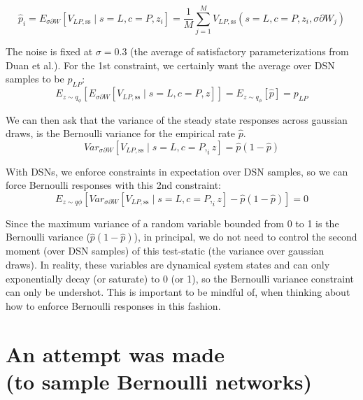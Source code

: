 \documentclass[11pt]{article}
\begin{document}
\begin{equation}
 \hat{p}_i = E_{\sigma \partial W} \left[ V_{LP,\text{ss}} \mid s=L, c=P, z_i \right] = \frac{1}{M}\sum_{j=1}^M V_{LP,\text{ss}}(s=L, c=P, z_i, \sigma \partial W_j)
 \end{equation}

The noise is fixed at $\sigma = 0.3$ (the average of satisfactory parameterizations from Duan et al.).  For the 1st constraint, we certainly want the average over DSN samples to be $p_{LP}$:
\begin{equation}
E_{z \sim q_\phi} \left[ E_{\sigma \partial W} \left[ V_{LP,\text{ss}} \mid s=L, c=P, z \right] \right] = E_{z \sim q_\phi} \left[ \hat{p} \right] = p_{LP}
\end{equation}

We can then ask that the variance of the steady state responses across gaussian draws, is the Bernoulli variance for the empirical rate $\hat{p}$.
\begin{equation}
 Var_{\sigma \partial W} \left[ V_{LP,\text{ss}} \mid s=L, c=P, _iz \right] = \hat{p}(1 - \hat{p})
\end{equation}

With DSNs, we enforce constraints in expectation over DSN samples, so we can force Bernoulli responses with this 2nd constraint:
\begin{equation}
E_{z \sim q\phi} \left[ Var_{\sigma \partial W} \left[ V_{LP,\text{ss}} \mid s=L, c=P, _iz \right] - \hat{p}(1 - \hat{p}) \right] = 0
\end{equation}

Since the maximum variance of a random variable bounded from 0 to 1 is the Bernoulli variance ($\hat{p}(1-\hat{p})$), in principal, we do not need to control the second moment (over DSN samples) of this test-static (the variance over gaussian draws).  In reality, these variables are dynamical system states and can only exponentially decay (or saturate) to 0 (or 1), so the Bernoulli variance constraint can only be undershot.  This is important to be mindful of, when thinking about how to enforce Bernoulli responses in this fashion.

\section{An attempt was made \\(to sample Bernoulli networks)}
\end{document}
